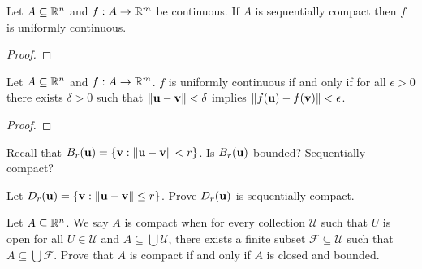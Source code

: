 \documentclass[letterpaper, twoside, 12pt]{book}
\begin{document}
\begin{theorem}[11.25, Exercise 5]
  Let \(A\subseteq\mathbb R^n\) and \(f:A\to\mathbb R^m\) be continuous.
  If \(A\) is sequentially compact then \(f\) is uniformly continuous.
\end{theorem}
\begin{proof}

\end{proof}

\begin{theorem}[11.27, Exercise 11]
  Let \(A\subseteq\mathbb R^n\) and \(f:A\to\mathbb R^m\).
  \(f\) is uniformly continuous if and only if for all \(\epsilon>0\)
  there exists \(\delta>0\) such that \(\|\mathbf u-\mathbf v\|<\delta\)
  implies \(\|f(\mathbf u)-f(\mathbf v)\|<\epsilon\).
\end{theorem}
\begin{proof}

\end{proof}

\begin{exercise}[2,3]
  Recall that \(B_r(\mathbf u)=\{\mathbf v:\|\mathbf u-\mathbf v\|<r\}\).
  Is \(B_r(\mathbf u)\) bounded? Sequentially compact?
\end{exercise}
\begin{solution}

\end{solution}

\begin{exercise}[4]
  Let \(D_r(\mathbf u)=\{\mathbf v:\|\mathbf u-\mathbf v\|\leq r\}\).
  Prove \(D_r(\mathbf u)\) is sequentially compact.
\end{exercise}
\begin{solution}

\end{solution}

\begin{exercise}
  Let \(A\subseteq\mathbb R^n\). We say \(A\) is compact when for every
  collection \(\mathcal U\) such that \(U\) is open
  for all \(U\in\mathcal U\) and \(A\subseteq\bigcup\mathcal U\), there exists
  a finite subset \(\mathcal F\subseteq\mathcal U\) such that
  \(A\subseteq\bigcup\mathcal F\). Prove that \(A\) is compact if and only if
  \(A\) is closed and bounded.
\end{exercise}
\begin{solution}

\end{solution}
\end{document}

